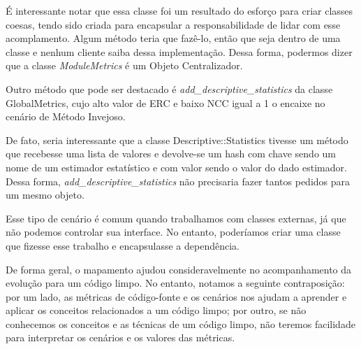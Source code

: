 É interessante notar que essa classe foi um resultado do esforço para criar classes coesas, tendo sido
criada para encapsular a responsabilidade de lidar com esse acomplamento. Algum método teria que fazê-lo,
então que seja dentro de uma classe e nenhum cliente saiba dessa implementação. Dessa forma, podermos dizer
que a classe \textit{ModuleMetrics} é um Objeto Centralizador.

Outro método que pode ser destacado é \textit{add\_descriptive\_statistics} da classe GlobalMetrics, cujo 
alto valor de ERC e baixo NCC igual a 1 o encaixe no cenário de Método Invejoso.



De fato, seria interessante que a classe Descriptive::Statistics tivesse um método que recebesse
uma lista de valores e devolve-se um hash com chave sendo um nome de um estimador estatístico e 
com valor sendo o valor do dado estimador. Dessa forma, \textit{add\_descriptive\_statistics} não precisaria
fazer tantos pedidos para um mesmo objeto.

Esse tipo de cenário é comum quando trabalhamos com classes externas, já que não podemos controlar
sua interface. No entanto, poderíamos criar uma classe que fizesse esse trabalho e encapsulasse
a dependência.


\vskip 0.5cm
De forma geral, o mapamento ajudou consideravelmente no acompanhamento da evolução para um código limpo.
No entanto, notamos a seguinte contraposição: por um lado, as métricas de código-fonte e os cenários nos
ajudam a aprender e aplicar os conceitos relacionados a um código limpo; por outro, se não conhecemos os
conceitos e as técnicas de um código limpo, não teremos facilidade para interpretar os cenários e os valores
das métricas.

